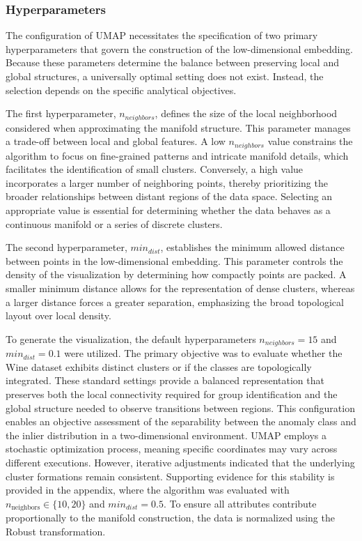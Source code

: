\subsubsection*{Hyperparameters}
The configuration of UMAP necessitates the specification of two primary hyperparameters \citep[p. 23]{mcinnes2018umap}that govern the construction of the low-dimensional embedding.
Because these parameters determine the balance between preserving local and global structures, a universally optimal setting does not exist.
Instead, the selection depends on the specific analytical objectives. 



The first hyperparameter, $n_ {neighbors}$, defines the size of the local neighborhood considered when approximating the manifold structure. This parameter manages a trade-off between local and global features. 
A low $n_ {neighbors}$ value constrains the algorithm to focus on fine-grained patterns and intricate manifold details, which facilitates the identification of small clusters. 
Conversely, a high value incorporates a larger number of neighboring points, thereby prioritizing the broader relationships between distant regions of the data space. 
Selecting an appropriate value is essential for determining whether the data behaves as a continuous manifold or a series of discrete clusters. 


The second hyperparameter, $min_{dist}$, establishes the minimum allowed distance between points in the low-dimensional embedding. 
This parameter controls the density of the visualization by determining how compactly points are packed. 
A smaller minimum distance allows for the representation of dense clusters, whereas a larger distance forces a greater separation, emphasizing the broad topological layout over local density. 


To generate the visualization, the default hyperparameters $n_{neighbors} = 15$ and $min_{dist} = 0.1$ were utilized. 
The primary objective was to evaluate whether the Wine dataset exhibits distinct clusters or if the classes are topologically integrated. 
These standard settings provide a balanced representation that preserves both the local connectivity required for group identification and the global structure needed to observe transitions between regions. 
This configuration enables an objective assessment of the separability between the anomaly class and the inlier distribution in a two-dimensional environment. 
UMAP employs a stochastic optimization process, meaning specific coordinates may vary across different executions. 
However, iterative adjustments indicated that the underlying cluster formations remain consistent. 
Supporting evidence for this stability is provided in the appendix, where the algorithm was evaluated with $n_{\text{neighbors}} \in \{10, 20\}$ and $min_{dist} = 0.5$. 
To ensure all attributes contribute proportionally to the manifold construction, the data is normalized using the Robust transformation. 
 

